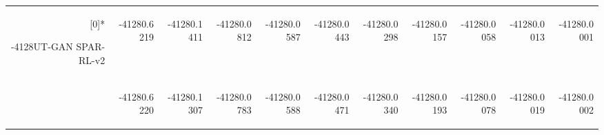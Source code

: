\begin{table}[htbp]
\begin{tabular}{rrrrrrrrrrr}
    \rowcolor[rgb]{ 0,  0,  0} \multirow{2}[0]{*}{\begin{turn}{-4128}UT-GAN SPAR-RL-v2\end{turn}} & \begin{turn}{-4128}0.6219 \end{turn} & \begin{turn}{-4128}0.1411 \end{turn} & \begin{turn}{-4128}0.0812 \end{turn} & \begin{turn}{-4128}0.0587 \end{turn} & \begin{turn}{-4128}0.0443 \end{turn} & \begin{turn}{-4128}0.0298 \end{turn} & \begin{turn}{-4128}0.0157 \end{turn} & \begin{turn}{-4128}0.0058 \end{turn} & \begin{turn}{-4128}0.0013 \end{turn} & \begin{turn}{-4128}0.0001 \end{turn} \\
    \rowcolor[rgb]{ 0,  0,  0}       & \begin{turn}{-4128}0.6220 \end{turn} & \begin{turn}{-4128}0.1307 \end{turn} & \begin{turn}{-4128}0.0783 \end{turn} & \begin{turn}{-4128}0.0588 \end{turn} & \begin{turn}{-4128}0.0471 \end{turn} & \begin{turn}{-4128}0.0340 \end{turn} & \begin{turn}{-4128}0.0193 \end{turn} & \begin{turn}{-4128}0.0078 \end{turn} & \begin{turn}{-4128}0.0019 \end{turn} & \begin{turn}{-4128}0.0002 \end{turn} \\
    \end{tabular}%
  \label{tab:addlabel}%
\end{table}%